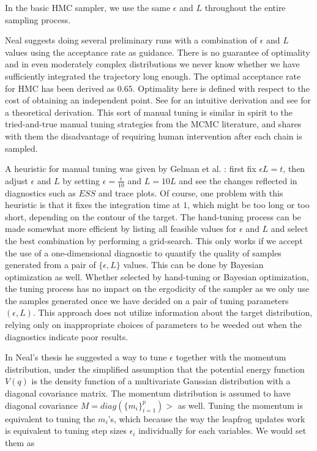 \documentclass[]{report}
\begin{document}
In the basic HMC sampler, we use the same $\epsilon$ and $L$ throughout the
entire sampling process.  

Neal \cite{neal1996sampling} suggests doing several preliminary runs with a combination of $\epsilon$ and $L$ values using the acceptance rate as guidance. There is no guarantee of optimality and in even moderately complex distributions we never know whether we have sufficiently integrated the trajectory long enough. The optimal acceptance rate for HMC has been derived as $0.65$. Optimality here is defined with respect to the cost of obtaining an independent point. See \cite{neal2011mcmc} for an intuitive derivation and see \cite{beskos2013optimal} for a theoretical derivation. This sort of manual tuning is similar in spirit to the tried-and-true manual tuning strategies from the MCMC literature, and shares with them the disadvantage of requiring human intervention after each chain is sampled. 

A heuristic for manual tuning was given by Gelman et al.
\cite{gelman2014bayesian}: first fix $\epsilon L = t$, then adjust $\epsilon$
and $L$ by setting $\epsilon = \frac{\epsilon}{10} $ and $L = 10L$ and see the
changes reflected in diagnostics such as $ESS$ and trace plots. Of course, one
problem with this heuristic is that it fixes the integration time at $1$, which
might be too long or too short, depending on the contour of the target. The hand-tuning process can be made somewhat more efficient by listing all feasible values
for $\epsilon$ and $L$ and select the best combination by performing a grid-search. This only works if we accept
the use of a one-dimensional diagnostic to quantify the quality of samples
generated from a pair of $\{\epsilon,L\}$ values. This can be done by Bayesian
optimization as well. Whether selected by hand-tuning or Bayesian optimization,
the tuning process has no impact on the ergodicity of the sampler as we only
use the samples generated once we have decided on a pair of tuning parameters
$(\epsilon,L)$. This approach does not utilize information about the target
distribution, relying only on inappropriate choices of parameters to be weeded
out when the diagnostics indicate poor results.

In Neal's thesis \cite{neal1996sampling} he suggested a way to tune $\epsilon$ together with the
momentum distribution,  under the simplified assumption that the potential
energy function $V(q)$ is the density function of a multivariate Gaussian distribution
with a diagonal
covariance matrix. The momentum distribution is assumed to have diagonal
covariance $M= diag(\{m_i\}_{i=1}^p)>$ as well. Tuning the momentum is
equivalent to tuning the $m_i$'s, which because the way the leapfrog updates
work is equivalent to tuning step sizes $\epsilon_i$ individually for each
variables. We would set them as
\end{document}
